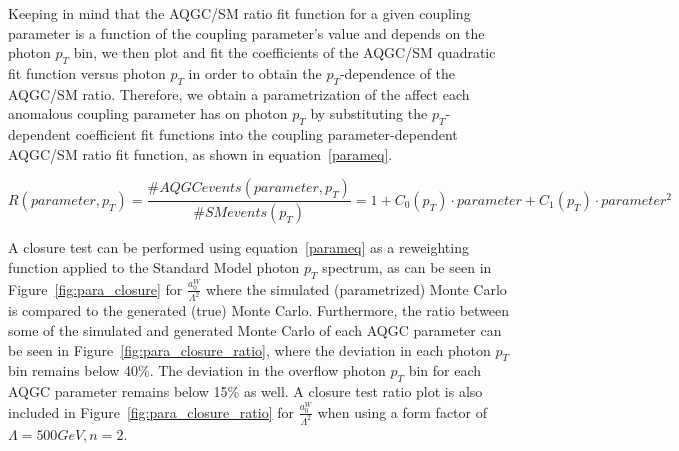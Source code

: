 Keeping in mind that the AQGC/SM ratio fit function for a given coupling 
parameter is a function of the coupling parameter's value and depends on the
photon $p_{T}$ bin, we then plot and fit the coefficients of the AQGC/SM 
quadratic fit function versus photon $p_{T}$ in order to obtain the 
$p_T{}$-dependence of the AQGC/SM ratio.  Therefore, we obtain a 
parametrization of the affect each anomalous coupling parameter has on 
photon $p_{T}$ by substituting the $p_{T}$-dependent coefficient fit 
functions into the coupling parameter-dependent AQGC/SM ratio fit function, 
as shown in equation~\ref{parameq}.

\begin{center}
\begin{equation}
R(parameter,p_{T}) = \frac{\# AQGC events(parameter,p_{T})}{\# SM events(p_{T})} = 1 + C_{0}(p_{T}) \cdot parameter + C_{1}(p_{T}) \cdot parameter^{2}
\label{parameq}
\end{equation}
\end{center}

A closure test can be performed using equation~\ref{parameq} as a 
reweighting function applied to the Standard Model photon $p_{T}$ spectrum, 
as can be seen in Figure~\ref{fig:para_closure} for 
$\frac{a_{0}^{W}}{\Lambda^{2}}$ where the simulated (parametrized) Monte 
Carlo is compared to the generated (true) Monte Carlo.  Furthermore, the 
ratio between some of the simulated and generated Monte Carlo of each AQGC 
parameter can be seen in Figure~\ref{fig:para_closure_ratio}, where the 
deviation in each photon $p_{T}$ bin remains below 40\%.  The deviation in 
the overflow photon $p_{T}$ bin for each AQGC parameter remains below 15\% 
as well. A closure test ratio plot is also included in
Figure~\ref{fig:para_closure_ratio} for $\frac{a_{0}^{W}}{\Lambda^{2}}$ when using
a form factor of $\Lambda = 500 GeV, n = 2$.

